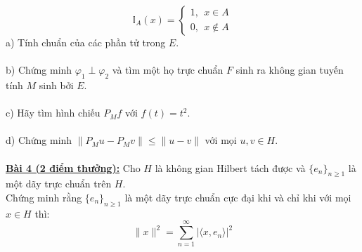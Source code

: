 \documentclass[10pt, a4paper]{article}
\begin{document}
$$\mathbb I_A(x)=\begin{cases}
	1,~~x\in A\\
	0,~~x\notin A
\end{cases}$$
\color{red}a) \color{black}Tính chuẩn của các phần tử trong $E$.\\\\
\color{red}b) \color{black}Chứng minh $\varphi_1\perp\varphi_2$ và tìm một họ trực chuẩn $F$ sinh ra không gian tuyến tính $M$ sinh bởi $E$.\\\\
\color{red}c) \color{black}Hãy tìm hình chiếu $P_Mf$ với $f(t)=t^2$.\\\\
\color{red}d) \color{black}Chứng minh $\lVert P_Mu-P_Mv\rVert\le\lVert u-v\rVert$ với mọi $u,v\in H$.\\\\
\color{red}\underline{\textbf{Bài 4 (2 điểm thưởng):}} \color{black}Cho $H$ là không gian Hilbert tách được và $\{e_n\}_{n\ge1}$ là một dãy trực chuẩn trên $H$.\\ Chứng minh rằng $\{e_n\}_{n\ge1}$ là một dãy trực chuẩn cực đại khi và chỉ khi với mọi $x\in H$ thì: $$\lVert x\rVert^2=\displaystyle\sum_{n=1}^\infty|\langle x,e_n\rangle|^2$$

\newpage
\end{document}
